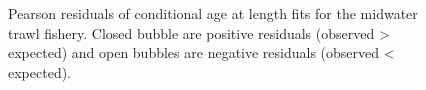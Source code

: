 \documentclass[
]{scrartcl}
\begin{document}
\begin{figure}[H]


\caption{\label{fig-peasrson-resids-age-midt}Pearson residuals of
conditional age at length fits for the midwater trawl fishery. Closed
bubble are positive residuals (observed \textgreater{} expected) and
open bubbles are negative residuals (observed \textless{} expected).}

\end{figure}%
\end{document}
